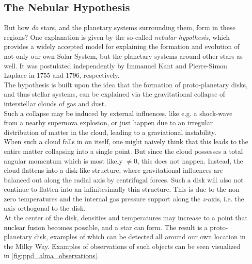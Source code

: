     

\clearpage\subsection{The Nebular Hypothesis}

    But how \textit{do} stars, and the planetary systems surrounding them, form in these regions?
    One explanation is given by 
    the so-called \textit{nebular hypothesis}, which provides a widely accepted model for 
    explaining the formation and evolution of not only our own Solar System, but the planetary 
    systems around other stars as well. 
    It was postulated independently by Immanuel Kant        %
    and Pierre-Simon Laplace                                %
    in 1755 and 1796, respectively. \\                      %

    The hypothesis is built upon the idea that the formation of proto-planetary disks, and thus 
    stellar systems, can be explained via the gravitational collapse of interstellar clouds 
    of gas and dust. \\

    Such a collapse may be induced by external influences, like e.g. a shock-wave from a nearby 
    supernova explosion, or just happen due to an irregular distribution of matter in the cloud, 
    leading to a graviational instability. \\

    When such a cloud falls in on itself, one might naively think that this leads to the 
    entire matter collapsing into a single point. But since the cloud possesses a total angular 
    momentum which is most likely $\neq 0$, this does not happen. 
    Instead, the cloud flattens into a disk-like structure, where gravitational influences
    are balanced out along the radial axis by centrifugal forces. 
    Such a disk will also not continue to flatten into an infinitesimally thin structure.
    This is due to the non-zero temperatures and the internal gas pressure support along the 
    $z$-axis, i.e. the axis orthogonal to the disk. \\

    At the center of the disk, densities and temperatures may increase to a point that 
    nuclear fusion becomes possible, and a star can form. 
    The result is a proto-planetary disk, examples of which can be detected all around our own 
    location in the Milky Way. Examples of observations of such objects can be seen visualized 
    in \cref{fig:ppd_alma_observations}.

